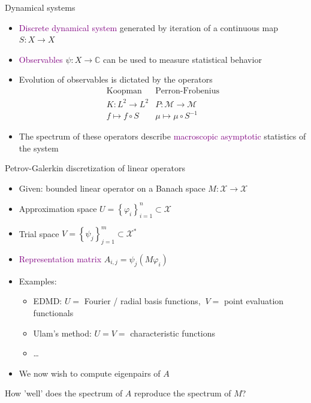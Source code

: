 \documentclass[
  english,            %
  aspectratio=169,    %
]{tumbeamer}
\newenvironment{emphbox}
  {\begin{tcolorbox}[colback=blue!5!white,colframe=blue!75!black]}
  {\end{tcolorbox}}
\newcommand{\bbC}{{\mathbb C}}
\newcommand{\cX}{\mathcal{X}}
\newcommand{\cM}{\mathcal{M}}
\renewcommand{\emph}[1]{\textcolor{purple}{#1}}
\begin{document}
\begin{frame}{Dynamical systems}
  
\begin{itemize}
  \item \emph{Discrete dynamical system} generated by iteration of a continuous map $S : X \to X$
  \item \emph{Observables} $\psi : X \to \bbC$ can be used to measure statistical behavior 
  \item Evolution of observables is dictated by the operators
  \begin{equation*}
    \begin{matrix}
      \text{Koopman} & \text{Perron-Frobenius} \\
      K : L^2 \to L^2 & P : \cM \to \cM \\
      f \mapsto f \circ S & \mu \mapsto \mu \circ S^{-1} 
    \end{matrix}
  \end{equation*}
  \item The spectrum of these operators describe \emph{macroscopic asymptotic} statistics of the system
\end{itemize}

\end{frame}

\begin{frame}{Petrov-Galerkin discretization of linear operators}

\begin{itemize}
  \item Given: bounded linear operator on a Banach space $M : \cX \to \cX$
  \item Approximation space $U = \left\{ \varphi_i \right\}_{i=1}^n \subset \cX$
  \item Trial space $V = \left\{ \psi_j \right\}_{j=1}^m \subset \cX^*$
  \item \emph{Representation matrix} $A_{i,j} = \psi_j( M \varphi_i )$
  \item Examples:
  \begin{itemize}
    \item EDMD: $U = $ Fourier / radial basis functions,$\ $ $V = $ point evaluation functionals
    \item Ulam's method: $U = V = $ characteristic functions
    \item \dots
  \end{itemize}
  \item We now wish to compute eigenpairs of $A$
\end{itemize}

\begin{emphbox}
  How 'well' does the spectrum of $A$ reproduce the spectrum of $M$?
\end{emphbox}
  
\end{frame}
\end{document}

